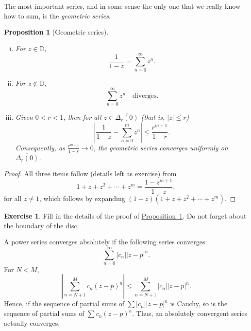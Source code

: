 \documentclass[12pt,openany]{book}
\newcommand{\sabs}[1]{\lvert {#1} \rvert}
\newcommand{\abs}[1]{\left\lvert {#1} \right\rvert}
\newcommand{\D}{{\mathbb{D}}}
\newcommand{\myindex}[1]{#1\index{#1}}
\theoremstyle{plain}
\newtheorem{prop}[thm]{Proposition}
\theoremstyle{remark}
\theoremstyle{definition}
\newenvironment{exbox}{%
    \def\FrameCommand{\vrule width 1pt \relax\hspace{10pt}}%
    \MakeFramed{\advance\hsize-\width\FrameRestore}%
}{%
    \endMakeFramed
}
\theoremstyle{exercise}
\newtheorem{exercise}{Exercise}[section]
\theoremstyle{example}
\newcommand{\propref}[1]{\hyperref[#1]{Proposition~\ref*{#1}}}
\begin{document}
The most important series, and in some sense the only one that we really
know how to sum, is the \emph{\myindex{geometric series}}.

\begin{prop}[Geometric series]\label{prop:geomseries}
\leavevmode
\begin{enumerate}[(i)]
\item For $z \in \D$,
\begin{equation*}
\frac{1}{1-z} = \sum_{n=0}^\infty z^n .
\end{equation*}
\item For $z \not\in \D$,
\begin{equation*}
\sum_{n=0}^\infty z^n \quad \text{diverges.}
\end{equation*}
\item
Given $0 < r < 1$, then for all $z \in \overline{\Delta_r(0)}$
(that is, $\sabs{z} \leq r$)
\begin{equation*}
\abs{\frac{1}{1-z} - \sum_{n=0}^m z^n}
\leq \frac{r^{m+1}}{1-r} .
\end{equation*}
Consequently,
as $\frac{r^{m+1}}{1-r} \to 0$,
the geometric series converges uniformly
on $\overline{\Delta_r(0)}$.
\end{enumerate}
\end{prop}

\begin{proof}
All three items follow (details left as exercise) from
\begin{equation*}
1+z+z^2+\cdots+z^m = \frac{1-z^{m+1}}{1-z} ,
\end{equation*}
for all $z \not= 1$, which follows by expanding 
$(1-z)(1+z+z^2+\cdots+z^m)$.
\end{proof}

\begin{exbox}
\begin{exercise}
Fill in the details of the proof of \propref{prop:geomseries}.  Do not forget
about the boundary of the disc.
\end{exercise}
\end{exbox}

A power series converges absolutely if the following series converges:
\begin{equation*}
\sum_{n=0}^\infty \sabs{c_n} \sabs{z-p}^n .
\end{equation*}
For $N < M$,
\begin{equation*}
\abs{\sum_{n=N+1}^M c_n {(z-p)}^n}
\leq
\sum_{n=N+1}^M \sabs{c_n} \sabs{z-p}^n.
\end{equation*}
Hence, if the sequence of partial sums of 
$\sum \sabs{c_n} \sabs{z-p}^n$ is Cauchy, so is the sequence
of partial sums of $\sum c_n {(z-p)}^n$.  Thus,
an absolutely convergent series
actually converges.
\end{document}
